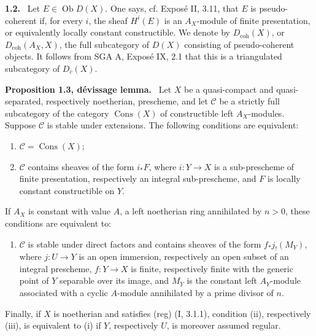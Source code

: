 \documentclass[12pt]{article}
\newcommand{\ob}{\operatorname{Ob}}
\newcommand{\cC}{\mathcal C}
\newenvironment{statement}[1]{\par\medskip\noindent\textbf{#1.}\ }{\par\medskip}
\begin{document}
\begin{statement}{1.2}
Let $E\in\ob D(X)$. One says, cf. Exposé II, 3.11, that $E$ is pseudo-coherent if, for every $i$, the sheaf $H^i(E)$ is an $A_X$-module of finite presentation, or equivalently locally constant constructible. We denote by $D_{\mathrm{coh}}(X)$, or $D_{\mathrm{coh}}(A_X,X)$, the full subcategory of $D(X)$ consisting of pseudo-coherent objects. It follows from SGA A, Exposé IX, 2.1 that this is a triangulated subcategory of $D_c(X)$.
\end{statement}

\begin{statement}{Proposition 1.3, dévissage lemma}
Let $X$ be a quasi-compact and quasi-separated, respectively noetherian, prescheme, and let $\cC$ be a strictly full subcategory of the category $\operatorname{Cons}(X)$ of constructible left $A_X$-modules. Suppose $\cC$ is stable under extensions. The following conditions are equivalent:
\begin{enumerate}[label=(\roman*)]
\item $\cC=\operatorname{Cons}(X)$;
\item $\cC$ contains sheaves of the form $i_*F$, where $i:Y\to X$ is a sub-prescheme of finite presentation, respectively an integral sub-prescheme, and $F$ is locally constant constructible on $Y$.
\end{enumerate}
If $A_X$ is constant with value $A$, a left noetherian ring annihilated by $n>0$, these conditions are equivalent to:
\begin{enumerate}[label=(\roman*)]
\item[(iii)] $\cC$ is stable under direct factors and contains sheaves of the form $f_*j_!(M_Y)$, where $j:U\to Y$ is an open immersion, respectively an open subset of an integral prescheme, $f:Y\to X$ is finite, respectively finite with the generic point of $Y$ separable over its image, and $M_Y$ is the constant left $A_Y$-module associated with a cyclic $A$-module annihilated by a prime divisor of $n$.
\end{enumerate}
Finally, if $X$ is noetherian and satisfies (reg) (I, 3.1.1), condition (ii), respectively (iii), is equivalent to (i) if $Y$, respectively $U$, is moreover assumed regular.
\end{statement}
\end{document}
